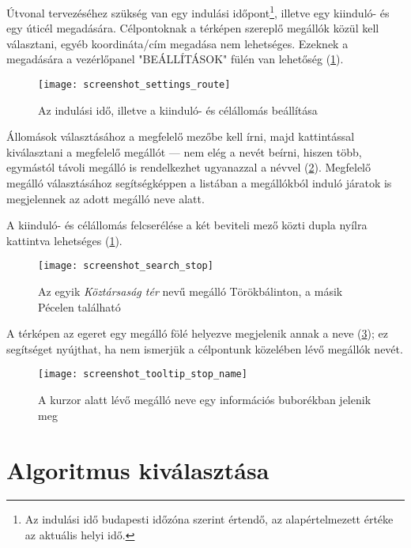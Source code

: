 Útvonal tervezéséhez szükség van egy indulási időpont\footnote{Az indulási idő budapesti időzóna szerint értendő, az alapértelmezett értéke az aktuális helyi idő.}, illetve egy kiinduló- és egy úticél megadására. Célpontoknak a térképen szereplő megállók közül kell választani, egyéb koordináta/cím megadása nem lehetséges. Ezeknek a megadására a vezérlőpanel "BEÁLLÍTÁSOK" fülén van lehetőség (\ref{fig:screenshot-settings-route}).

\begin{figure}[H]
	\centering
	\texttt{[image: screenshot\_settings\_route]}
	\caption{Az indulási idő, illetve a kiinduló- és célállomás beállítása}
	\label{fig:screenshot-settings-route}
\end{figure}

Állomások választásához a megfelelő mezőbe kell írni, majd kattintással kiválasztani a megfelelő megállót --- nem elég a nevét beírni, hiszen több, egymástól távoli megálló is rendelkezhet ugyanazzal a névvel (\ref{fig:screenshot-search-stop}). Megfelelő megálló választásához segítségképpen a listában a megállókból induló járatok is megjelennek az adott megálló neve alatt.

A kiinduló- és célállomás felcserélése a két beviteli mező közti dupla nyílra kattintva lehetséges (\ref{fig:screenshot-settings-route}).

\begin{figure}[H]
	\centering
	\texttt{[image: screenshot\_search\_stop]}
	\caption{Az egyik \emph{Köztársaság tér} nevű megálló Törökbálinton, a másik Pécelen található}
	\label{fig:screenshot-search-stop}
\end{figure}

A térképen az egeret egy megálló fölé helyezve megjelenik annak a neve (\ref{fig:screenshot-tooltip-stop-name}); ez segítséget nyújthat, ha nem ismerjük a célpontunk közelében lévő megállók nevét.

\begin{figure}[H]
	\centering
	\texttt{[image: screenshot\_tooltip\_stop\_name]}
	\caption{A kurzor alatt lévő megálló neve egy információs buborékban jelenik meg}
	\label{fig:screenshot-tooltip-stop-name}
\end{figure}

\section{Algoritmus kiválasztása}

